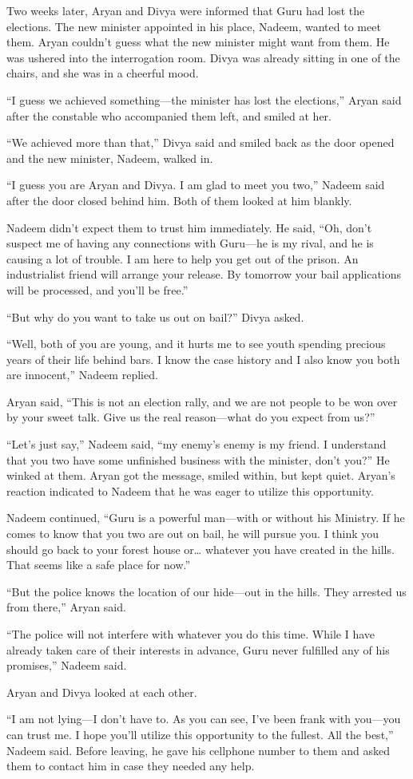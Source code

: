 Two weeks later, Aryan and Divya were informed that Guru had lost the elections.
The new minister appointed in his place, Nadeem, wanted to meet them. Aryan
couldn't guess what the new minister might want from them. He was ushered into
the interrogation room. Divya was already sitting in one of the chairs, and she
was in a cheerful mood.

“I guess we achieved something—the minister has lost the elections,” Aryan
said after the constable who accompanied them left, and smiled at her.

“We achieved more than that,” Divya said and smiled back as the door opened and
the new minister, Nadeem, walked in.

“I guess you are Aryan and Divya. I am glad to meet you two,” Nadeem said after
the door closed behind him. Both of them looked at him blankly.

Nadeem didn't expect them to trust him immediately. He said, “Oh, don't suspect
me of having any connections with Guru—he is my rival, and he is causing a lot of
trouble. I am here to help you get out of the prison. An industrialist friend
will arrange your release. By tomorrow your bail applications will be processed,
and you'll be free.”

“But why do you want to take us out on bail?” Divya asked.

“Well, both of you are young, and it hurts me to see youth spending precious
years of their life behind bars. I know the case history and I also know you
both are innocent,” Nadeem replied.

Aryan said, “This is not an election rally, and we are not people to be won over
by your sweet talk. Give us the real reason—what do you expect from us?”

“Let's just say,” Nadeem said, “my enemy's enemy is my friend. I understand that
you two have some unfinished business with the minister, don't you?” He winked
at them. Aryan got the message, smiled within, but kept quiet. Aryan's reaction
indicated to Nadeem that he was eager to utilize this opportunity.

Nadeem continued, “Guru is a powerful man—with or without his Ministry. If he
comes to know that you two are out on bail, he will pursue you. I think you
should go back to your forest house or… whatever you have created in the
hills. That seems like a safe place for now.”

“But the police knows the location of our hide—out in the hills. They arrested
us from there,” Aryan said.

“The police will not interfere with whatever you do this time. While I have
already taken care of their interests in advance, Guru never fulfilled any of
his promises,” Nadeem said.

Aryan and Divya looked at each other.

“I am not lying—I don't have to. As you can see, I've been frank with you—you
can trust me. I hope you'll utilize this opportunity to the fullest. All the
best,” Nadeem said. Before leaving, he gave his cellphone number to them and
asked them to contact him in case they needed any help.
